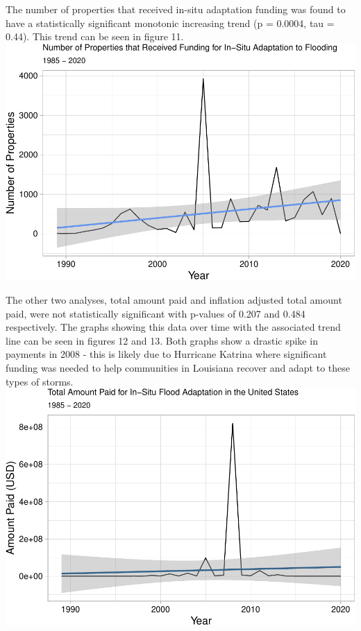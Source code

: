 \documentclass[
  12pt,
]{article}
\begin{document}
The number of properties that received in-situ adaptation funding was
found to have a statistically significant monotonic increasing trend (p
= 0.0004, tau = 0.44). This trend can be seen in figure 11. \newline
\includegraphics{finalreport_files/figure-latex/unnamed-chunk-19-1.pdf}

The other two analyses, total amount paid and inflation adjusted total
amount paid, were not statistically significant with p-values of 0.207
and 0.484 respectively. The graphs showing this data over time with the
associated trend line can be seen in figures 12 and 13. Both graphs show
a drastic spike in payments in 2008 - this is likely due to Hurricane
Katrina where significant funding was needed to help communities in
Louisiana recover and adapt to these types of storms. \newline
\includegraphics{finalreport_files/figure-latex/unnamed-chunk-20-1.pdf}
\end{document}
